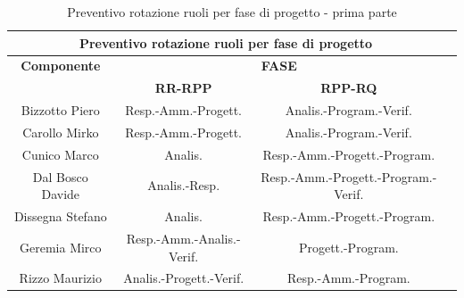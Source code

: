 \newpage

\begin{table}[!h]
	\begin{center}
		  \begin{tabular}
			  {|c|c|c|c|}
		 \hline
			\multicolumn{3}{|c|}{ \textbf{Preventivo rotazione ruoli per fase di progetto} } \\
			\hline
			\textbf{Componente} & \multicolumn{2}{|c|}{ \textbf{FASE} } \\
			\hline
			& \textbf{RR-RPP} & \textbf{RPP-RQ} \\
			\hline
			Bizzotto Piero & Resp.-Amm.-Progett.  & Analis.-Program.-Verif. \\
			\hline
			Carollo Mirko & Resp.-Amm.-Progett.  & Analis.-Program.-Verif.   \\
			\hline
			Cunico Marco & Analis.  & Resp.-Amm.-Progett.-Program.  \\
			\hline
			Dal Bosco Davide & Analis.-Resp.  & Resp.-Amm.-Progett.-Program.-Verif.  \\
			\hline
			Dissegna Stefano & Analis.  & Resp.-Amm.-Progett.-Program.  \\
			\hline
			Geremia Mirco & Resp.-Amm.-Analis.-Verif.  & Progett.-Program.  \\
			\hline
			Rizzo Maurizio & Analis.-Progett.-Verif. & Resp.-Amm.-Program. \\
			\hline

		\end{tabular}
	\caption{Preventivo rotazione ruoli per fase di progetto - prima parte} %
	\label{tab:TabellaRotazRuoliUno}
	\end{center}	
\end{table}
